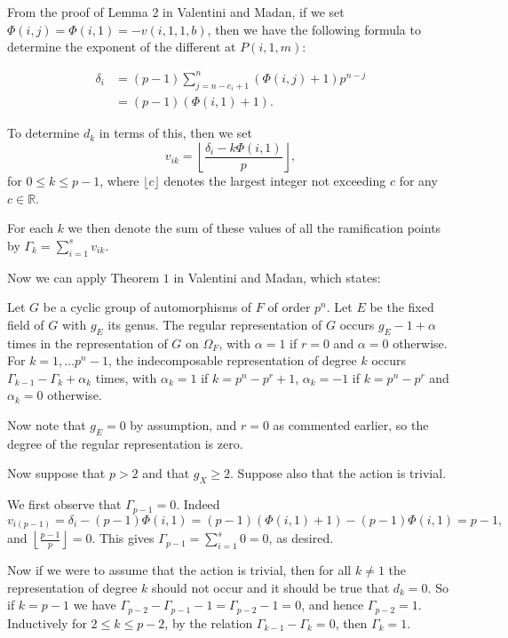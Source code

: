 From the proof of Lemma 2 in Valentini and Madan, if we set $\Phi(i,j) = \Phi(i,1) = -v(i,1,1,b)$, then we have the following formula to determine the exponent of the different at $P(i,1,m)$:

\begin{align}\label{eq}
\delta_i & =  (p-1)\sum_{j=n-e_i+1}^n (\Phi(i,j) + 1)p^{n-j} \\
	    & =  (p-1)(\Phi(i,1) + 1).
\end{align}

To determine $d_k$ in terms of this, then we set 
\[
v_{ik} = \left\lfloor \frac{\delta_i - k\Phi(i,1)}{p} \right\rfloor,
\]
for $0\leq k \leq p-1$, where $\lfloor c \rfloor$ denotes the largest integer not exceeding $c$ for any $c\in \mathbb{R}$.

For each $k$ we then denote the sum of these values of all the ramification points by $ \Gamma_k = \sum_{i=1}^s v_{ik}.$

Now we can apply Theorem $1$ in Valentini and Madan, which states:
\begin{thm}
Let $G$ be a cyclic group of automorphisms of $F$ of order $p^n$. 
Let $E$ be the fixed field of $G$ with $g_E$ its genus.
The regular representation of $G$ occurs $g_E-1+\alpha$ times in the representation of $G$ on $\Omega_F$, with $\alpha = 1$ if $r=0$ and $\alpha = 0$ otherwise.
For $k=1,\ldots p^n-1$, the indecomposable representation of degree $k$ occurs $\Gamma_{k-1}-\Gamma_k + \alpha_k$ times, with $\alpha_k = 1$ if $k= p^n-p^r +1$, $\alpha_k = -1$ if $k=p^n-p^r$ and $\alpha_k = 0$ otherwise.
\end{thm}

Now note that $g_E=0$ by assumption, and $r=0$ as commented earlier, so the degree of the regular representation is zero.

Now suppose that $p>2$ and that $g_X\geq 2$.
Suppose also that the action is trivial.


We first observe that $\Gamma_{p-1} = 0$. Indeed
\[
 v_{i(p-1)} = \delta_i - (p-1)\Phi(i,1) = (p-1)(\Phi(i,1) + 1) - (p-1)\Phi(i,1) = p-1,
\]
and $\left \lfloor \frac{p-1}{p} \right\rfloor = 0$. This gives $\Gamma_{p-1} = \sum_{i=1}^s 0 = 0$, as desired.

Now if we were to assume that the action is trivial, then for all $k\neq 1$ the representation of degree $k$ should not occur and it should be true that $d_k = 0$.
So if $k= p-1$ we have $\Gamma_{p-2} - \Gamma_{p-1} - 1 = \Gamma_{p-2} -1 = 0$, and hence $\Gamma_{p-2} = 1$.
Inductively for $2\leq k \leq p-2$, by the relation $\Gamma_{k-1} - \Gamma_k =0$, then $\Gamma_k = 1$.

